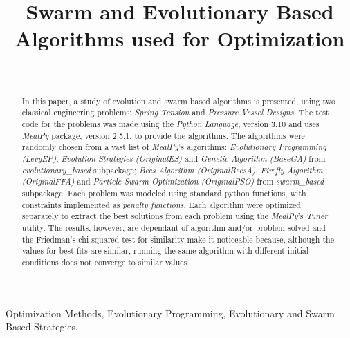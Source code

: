 \documentclass[conference]{IEEEtran}
\begin{document}
\title{Swarm and Evolutionary Based Algorithms used for Optimization}
\author{
	\\
}

\maketitle


\begin{abstract}
    In this paper, a study of evolution and swarm based algorithms is presented,
    using two classical engineering problems: \textit{Spring Tension} and \textit{Pressure Vessel
    Designs}. The test code for the problems was made using the \textit{Python Language},
    version 3.10 and uses \textit{MealPy} package, version 2.5.1,  to provide the algorithms.
    The algorithms were randomly chosen from a vast list of \textit{MealPy}'s algorithms:
    \textit{Evolutionary Programming (LevyEP)}, \textit{Evolution Strategies (OriginalES)} and
    \textit{Genetic Algorithm (BaseGA)} from \textit{evolutionary\_based} subpackage;
    \textit{Bees Algorithm (OriginalBeesA)}, \textit{Firefly Algorithm (OriginalFFA)} and
    \textit{Particle Swarm Optimization (OriginalPSO)} from \textit{swarm\_based} subpackage.
    Each problem was modeled using standard python functions, with constraints implemented as
    \textit{penalty functions}.
    Each algorithm were optimized separately to extract the best
    solutions from each problem using the \textit{MealPy}'s \textit{Tuner} utility.
    The results, however, are dependant of algorithm and/or problem solved and the Friedman's chi
    squared test for similarity make it noticeable because, although the values for best fits are
    similar, running the same algorithm with different initial conditions does not converge to similar
    values.
\end{abstract}

\begin{IEEEkeywords}
	Optimization Methods, Evolutionary Programming, Evolutionary and Swarm Based Strategies.
\end{IEEEkeywords}
\end{document}
